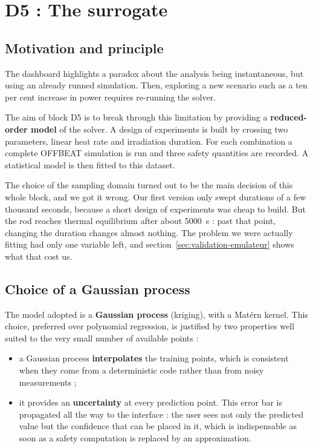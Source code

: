 \documentclass[12pt,a4paper]{report}
\begin{document}
\section{D5 : The surrogate}

\subsection{Motivation and principle}


The dashboard highlights a paradox about the analysis being instantaneous, but using an already runned simulation.
Then, exploring a new scenario such as a ten per cent increase in power requires re-running the
solver.

The aim of block D5 is to break through this limitation by providing a \textbf{reduced-order model} of the solver.
A design of experiments is built by crossing two
parameters, linear heat rate and irradiation duration. For each combination a
complete OFFBEAT simulation is run and three safety quantities are recorded. A
statistical model is then fitted to this dataset.

The choice of the sampling domain turned out to be the main decision of this
whole block, and we got it wrong. Our first version only swept durations of a few
thousand seconds, because a short design of experiments was cheap to build. But
the rod reaches thermal equilibrium after about \SI{5000}{\second} : past that
point, changing the duration changes almost nothing. The problem we were actually
fitting had only one variable left, and section~\ref{sec:validation-emulateur}
shows what that cost us.



\subsection{Choice of a Gaussian process}

The model adopted is a \textbf{Gaussian process} (kriging), with a Matérn
kernel. This choice, preferred over polynomial regression, is justified by two
properties well suited to the very small number of available points :

\begin{itemize}
  \item a Gaussian process \textbf{interpolates} the training points, which is
    consistent when they come from a deterministic code rather than from noisy
    measurements ;
  \item it provides an \textbf{uncertainty} at every prediction point. This
    error bar is propagated all the way to the interface : the user sees not only
    the predicted value but the confidence that can be placed in it, which is
    indispensable as soon as a safety computation is replaced by an
    approximation.
\end{itemize}
\end{document}
